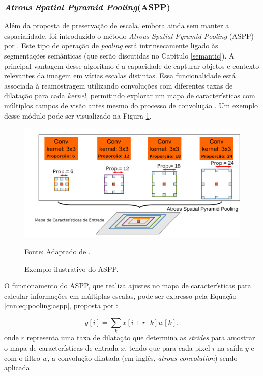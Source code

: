 \subsubsection{\textit{Atrous Spatial Pyramid Pooling}(ASPP)}
\label{cnn:pooling:aspp}
Além da proposta de preservação de escala, embora ainda sem manter a espacialidade, foi introduzido o método \textit{Atrous Spatial Pyramid Pooling} (ASPP) por \cite{Chen2018}. Este tipo de operação de \textit{pooling} está intrinsecamente ligado às segmentações semânticas \citep{Mohan2020} (que serão discutidas no Capítulo \ref{semantic}). A principal vantagem desse algoritmo é a capacidade de capturar objetos e contexto relevantes da imagem em várias escalas distintas. Essa funcionalidade está associada à reamostragem utilizando convoluções com diferentes taxas de dilatação para cada \textit{kernel}, permitindo explorar um mapa de características com múltiplos campos de visão antes mesmo do processo de convolução \citep{Chen2018}. Um exemplo desse módulo pode ser visualizado na Figura \ref{cnn:fig:aspp}.

\begin{figure}[H]
    \centering
    \caption{Exemplo ilustrativo do ASPP.}
    \includegraphics[width=1\textwidth]{recursos/imagens/project/aspp.png}
    \label{cnn:fig:aspp}

    Fonte: Adaptado de \cite{Chen2018}.
\end{figure}

O funcionamento do ASPP, que realiza ajustes no mapa de características para calcular informações em múltiplas escalas, pode ser expresso pela Equação \ref{cnn:eq:pooling:aspp}, proposta por \cite{Chen2018}:

\begin{equation}
    \label{cnn:eq:pooling:aspp}
    y[i] = \sum_{k}x[i + r \cdot k]w [k],
\end{equation}
onde $r$ representa uma taxa de dilatação que determina as \textit{strides} para amostrar o mapa de características de entrada $x$, tendo que para cada pixel $i$ na saída $y$ e com o filtro $w$, a convolução dilatada (em inglês, \textit{atrous convolution}) sendo aplicada.

